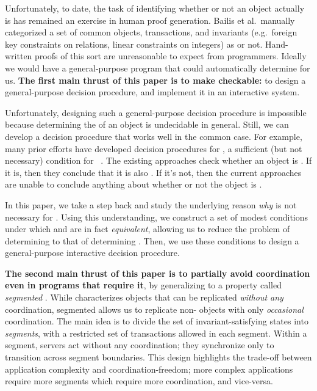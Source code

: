 Unfortunately, to date, the task of identifying whether or not an object
actually is \invariantconfluent{} has remained an exercise in human proof
generation. Bailis et al.\ manually categorized a set of common objects,
transactions, and invariants (e.g.\ foreign key constraints on relations,
linear constraints on integers) as \invariantconfluent{} or not. Hand-written
proofs of this sort are unreasonable to expect from programmers. Ideally we
would have a general-purpose program that could automatically determine
\invariantconfluence{} for us.  \textbf{The first main thrust of this paper is
to make \invariantconfluence{} checkable:} to design a general-purpose
\invariantconfluence{} decision procedure, and implement it in an interactive
system.

Unfortunately, designing such a general-purpose decision procedure is
impossible because determining the \invariantconfluence{} of an object is
undecidable in general. Still, we can develop a decision procedure that works
well in the common case.
%
For example, many prior efforts have developed decision procedures for
\emph{\invariantclosure{}}, a sufficient (but not necessary) condition for
\invariantconfluence{}~\cite{li2012making, li2014automating}. The existing
approaches check whether an object is \invariantclosed{}. If it is, then they
conclude that it is also \invariantconfluent{}. If it's not, then the current
approaches are unable to conclude anything about whether or not the object is
\invariantconfluent{}.

In this paper, we take a step back and study the underlying reason \emph{why}
\invariantclosure{} is not necessary for \invariantconfluence{}. Using this
understanding, we construct a set of modest conditions under which
\invariantclosure{} and \invariantconfluence{} are in fact \emph{equivalent},
allowing us to reduce the problem of determining \invariantconfluence{} to that
of determining \invariantclosure{}. Then, we use these conditions to design a
general-purpose interactive \invariantconfluence{} decision procedure.

\textbf{The second main thrust of this paper is to partially avoid coordination
even in programs that require it}, by generalizing \invariantconfluence{} to a
property called \emph{segmented \invariantconfluence{}}. While
\invariantconfluence{} characterizes objects that can be replicated
\emph{without any} coordination, segmented \invariantconfluence{} allows us to
replicate non-\invariantconfluent{} objects with only \emph{occasional}
coordination. The main idea is to divide the set of invariant-satisfying states
into \emph{segments}, with a restricted set of transactions allowed in each
segment. Within a segment, servers act without any coordination; they
synchronize only to transition across segment boundaries. This design
highlights the trade-off between application complexity and
coordination-freedom; more complex applications require more segments which
require more coordination, and vice-versa.

